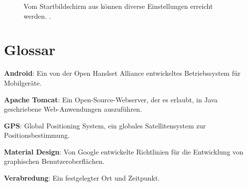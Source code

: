 \documentclass[parskip=full,11pt]{scrartcl}
\begin{document}
\begin{figure}[hb]
		\caption{\label{fig:map}
			Vom Startbildschirm aus können diverse Einstellungen erreicht werden.
			.
		}
\end{figure}

\section{Glossar}

\textbf{Android}:
Ein von der Open Handset Alliance entwickeltes Betriebssystem für Mobilgeräte.

\textbf{Apache Tomcat}:
Ein Open-Source-Webserver, der es erlaubt, in Java geschriebene Web-Anwendungen
auszuführen.

\textbf{GPS}:
Global Positioning System, ein globales Satellitensystem zur
Positionsbestimmung.

\textbf{Material Design}:
Von Google entwickelte Richtlinien für die Entwicklung von graphischen
Benutzeroberflächen.

\textbf{Verabredung}:
Ein festgelegter Ort und Zeitpunkt.
\end{document}
